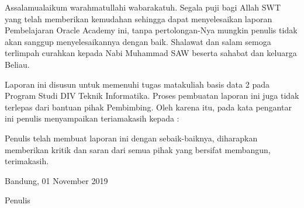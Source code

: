 \begin{acknowledgements}
Assalamualaikum warahmatullahi wabarakatuh. Segala puji bagi Allah SWT yang telah memberikan kemudahan sehingga dapat menyelesaikan laporan Pembelajaran Oracle Academy ini, tanpa pertolongan-Nya mungkin penulis tidak akan sanggup menyelesaikannya dengan baik. Shalawat dan salam semoga terlimpah curahkan kepada Nabi Muhammad SAW beserta sahabat dan keluarga Beliau.

Laporan ini disusun untuk memenuhi tugas matakuliah basis data 2 pada Program Studi DIV Teknik Informatika. Proses pembuatan laporan ini juga tidak terlepas dari bantuan pihak Pembimbing. Oleh karena itu, pada kata pengantar ini penulis menyampaikan teriamakasih kepada :

Penulis telah membuat laporan ini dengan sebaik-baiknya, diharapkan memberikan kritik dan saran dari semua pihak yang bersifat membangun, terimakasih.

\begin{raggedleft}

Bandung, 01 November 2019

Penulis

\end{raggedleft}

\end{acknowledgements}